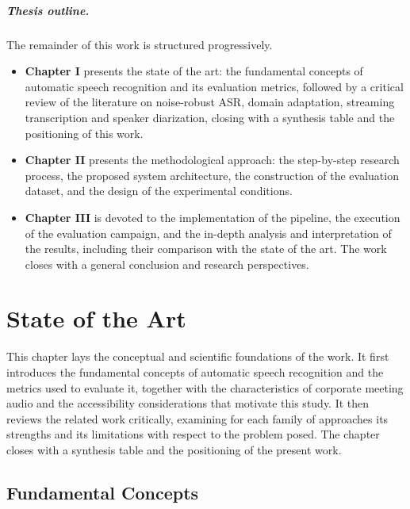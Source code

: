 \documentclass[12pt]{report}
\begin{document}
\paragraph{Thesis outline.}
The remainder of this work is structured progressively.
\begin{itemize}
    \item \textbf{Chapter I} presents the state of the art: the fundamental concepts of automatic speech recognition and its evaluation metrics, followed by a critical review of the literature on noise-robust ASR, domain adaptation, streaming transcription and speaker diarization, closing with a synthesis table and the positioning of this work.
    \item \textbf{Chapter II} presents the methodological approach: the step-by-step research process, the proposed system architecture, the construction of the evaluation dataset, and the design of the experimental conditions.
    \item \textbf{Chapter III} is devoted to the implementation of the pipeline, the execution of the evaluation campaign, and the in-depth analysis and interpretation of the results, including their comparison with the state of the art. The work closes with a general conclusion and research perspectives.
\end{itemize}
\newpage
\chapter{State of the Art}
This chapter lays the conceptual and scientific foundations of the work. It first introduces the fundamental concepts of automatic speech recognition and the metrics used to evaluate it, together with the characteristics of corporate meeting audio and the accessibility considerations that motivate this study. It then reviews the related work critically, examining for each family of approaches its strengths and its limitations with respect to the problem posed. The chapter closes with a synthesis table and the positioning of the present work.
\section{Fundamental Concepts}
\end{document}

